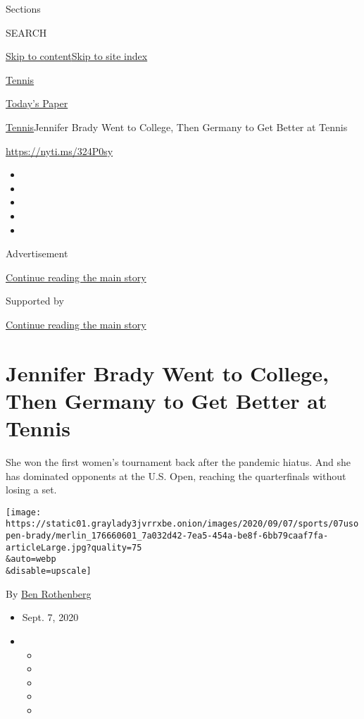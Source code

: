 Sections

SEARCH

\protect\hyperlink{site-content}{Skip to
content}\protect\hyperlink{site-index}{Skip to site index}

\href{https://www.nytimes3xbfgragh.onion/section/sports/tennis}{Tennis}

\href{https://myaccount.nytimes3xbfgragh.onion/auth/login?response_type=cookie\&client_id=vi}{}

\href{https://www.nytimes3xbfgragh.onion/section/todayspaper}{Today's
Paper}

\href{/section/sports/tennis}{Tennis}\textbar{}Jennifer Brady Went to
College, Then Germany to Get Better at Tennis

\url{https://nyti.ms/324P0sy}

\begin{itemize}
\item
\item
\item
\item
\item
\end{itemize}

Advertisement

\protect\hyperlink{after-top}{Continue reading the main story}

Supported by

\protect\hyperlink{after-sponsor}{Continue reading the main story}

\hypertarget{jennifer-brady-went-to-college-then-germany-to-get-better-at-tennis}{%
\section{Jennifer Brady Went to College, Then Germany to Get Better at
Tennis}\label{jennifer-brady-went-to-college-then-germany-to-get-better-at-tennis}}

She won the first women's tournament back after the pandemic hiatus. And
she has dominated opponents at the U.S. Open, reaching the quarterfinals
without losing a set.

\texttt{[image: https://static01.graylady3jvrrxbe.onion/images/2020/09/07/sports/07usopen-brady/merlin\_176660601\_7a032d42-7ea5-454a-be8f-6bb79caaf7fa-articleLarge.jpg?quality=75\\\&auto=webp\\\&disable=upscale]}

By \href{https://www.nytimes3xbfgragh.onion/by/ben-rothenberg}{Ben
Rothenberg}

\begin{itemize}
\item
  Sept. 7, 2020
\item
  \begin{itemize}
  \item
  \item
  \item
  \item
  \item
  \end{itemize}
\end{itemize}

